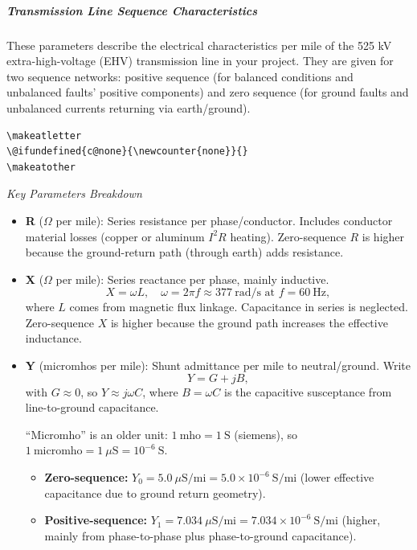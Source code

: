 \subparagraph{Transmission Line Sequence Characteristics}

These parameters describe the electrical characteristics per mile of the 525 kV extra-high-voltage (EHV) transmission line in your project. They are given for two sequence networks: positive sequence (for balanced conditions and unbalanced faults' positive components) and zero sequence (for ground faults and unbalanced currents returning via earth/ground).

\begin{verbatim}
\makeatletter
\@ifundefined{c@none}{\newcounter{none}}{}
\makeatother
\end{verbatim}

\textit{Key Parameters Breakdown}

\begin{itemize}
\item \textbf{R} ($\Omega$ per mile): Series resistance per phase/conductor. Includes conductor material losses (copper or aluminum $I^2R$ heating). Zero-sequence $R$ is higher because the ground-return path (through earth) adds resistance.
\item \textbf{X} ($\Omega$ per mile): Series reactance per phase, mainly inductive.
\begin{equation}
X = \omega L, \quad \omega = 2\pi f \approx 377~\text{rad/s} \text{ at } f = 60~\text{Hz},
\end{equation}
where $L$ comes from magnetic flux linkage. Capacitance in series is neglected. Zero-sequence $X$ is higher because the ground path increases the effective inductance.


\item \textbf{Y} (micromhos per mile): Shunt admittance per mile to neutral/ground. Write
\begin{equation}
Y = G + jB,
\end{equation}
with $G \approx 0$, so $Y \approx j\omega C$, where $B = \omega C$ is the capacitive susceptance from line-to-ground capacitance.

``Micromho'' is an older unit:\newline
$1~\text{mho} = 1~\text{S}$ (siemens), so\newline
$1~\text{micromho} = 1~\mu\text{S} = 10^{ -6}~\text{S}$.

\begin{itemize}
\item \textbf{Zero-sequence:}\newline
$Y_0 = 5.0~\mu\text{S/mi} = 5.0 \times 10^{ -6}~\text{S/mi}$\newline
(lower effective capacitance due to ground return geometry).
\item \textbf{Positive-sequence:}\newline
$Y_1 = 7.034~\mu\text{S/mi} = 7.034 \times 10^{ -6}~\text{S/mi}$\newline
(higher, mainly from phase-to-phase plus phase-to-ground capacitance).
\end{itemize}
\end{itemize}

